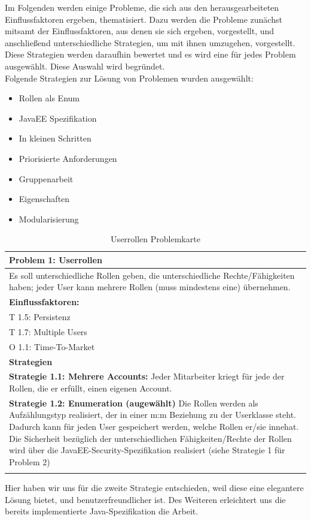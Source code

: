 \documentclass[enabledeprecatedfontcommands,fontsize=12pt,paper=a4,twoside]{scrartcl}
\begin{document}
Im Folgenden werden einige Probleme, die sich aus den herausgearbeiteten Einflussfaktoren ergeben, thematisiert. Dazu werden die Probleme zunächst mitsamt der Einflussfaktoren, aus denen sie sich ergeben, vorgestellt, und anschließend unterschiedliche Strategien, um mit ihnen umzugehen, vorgestellt. \\ Diese Strategien werden daraufhin bewertet und es wird eine für jedes Problem ausgewählt. Diese Auswahl wird begründet. \\ 
Folgende Strategien zur Lösung von Problemen wurden ausgewählt: \\
\begin{itemize}
\item Rollen als Enum
\item JavaEE Spezifikation
\item In kleinen Schritten
\item Priorisierte Anforderungen
\item Gruppenarbeit
\item Eigenschaften
\item Modularisierung
\end{itemize}



\begin{table}[H]
    \centering
    \begin{tabular}{|p{15cm}|}
    \hline
          \textbf{Problem 1:} Userrollen \\ \hline
          Es soll unterschiedliche Rollen geben, die unterschiedliche Rechte/Fähigkeiten haben; jeder User kann mehrere Rollen (muss mindestens eine) übernehmen. \\ \hline
          \textbf{Einflussfaktoren: } \\
          T 1.5: Persistenz \\
          T 1.7: Multiple Users\\
          O 1.1: Time-To-Market \\
          \hline
          \textbf{Strategien} \\ \hline
          \textbf{Strategie 1.1: Mehrere Accounts:} Jeder Mitarbeiter kriegt für jede der Rollen, die er erfüllt, einen eigenen Account. \\
          \textbf{Strategie 1.2: Enumeration (augewählt)} Die Rollen werden als Aufzählungstyp realisiert, der in einer m:m Beziehung zu der Userklasse steht. Dadurch kann für jeden User gespeichert werden, welche Rollen er/sie innehat. Die Sicherheit bezüglich der unterschiedlichen Fähigkeiten/Rechte der Rollen wird über die JavaEE-Security-Spezifikation realisiert (siehe Strategie 1 für Problem 2)\\
	 \\ \hline
    \end{tabular}

    \caption{Userrollen Problemkarte}
    \label{tab:ProblemKarte1}
\end{table}
Hier haben wir uns für die zweite Strategie entschieden, weil diese eine elegantere Lösung bietet, und benutzerfreundlicher ist. Des Weiteren erleichtert uns die bereits implementierte Java-Spezifikation die Arbeit. \\
\end{document}

